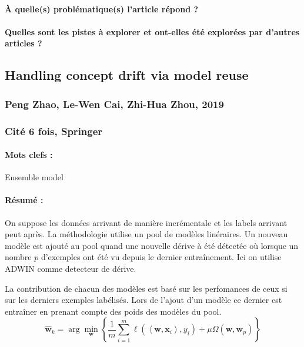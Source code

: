 \documentclass[11pt,a4paper]{report}
\begin{document}
\paragraph{À quelle(s) problématique(s) l'article répond ?} 

\paragraph{Quelles sont les pistes à explorer et ont-elles  été explorées par d'autres articles ?} 




\subsection{Handling concept drift via model reuse}
\subsubsection{Peng Zhao, Le-Wen Cai, Zhi-Hua Zhou, 2019}

\subsubsection{Cité 6 fois, Springer}

\paragraph{Mots clefs :} Ensemble model

\paragraph{Résumé :} On suppose les données arrivant de manière incrémentale et les labels arrivant peut après. La méthodologie utilise un pool de modèles linéraires. Un nouveau modèle est ajouté au pool quand une nouvelle dérive à été détectée où lorsque un nombre $p$ d'exemples ont été vu depuis le dernier entraînement. Ici on utilise ADWIN comme detecteur de dérive. 

La contribution de chacun des modèles est basé sur les perfomances de ceux si sur les derniers exemples labélisés. Lors de l'ajout d'un modèle ce dernier est entraîner en prenant compte des poids des modèles du pool. $$\hat{\mathbf{w}}_{k}=\arg \min _{\mathbf{w}}\left\{\frac{1}{m} \sum_{i=1}^{m} \ell\left(\left\langle\mathbf{w}, \mathbf{x}_{i}\right\rangle, y_{i}\right)+\mu \Omega\left(\mathbf{w}, \mathbf{w}_{p}\right)\right\}$$
\end{document}
